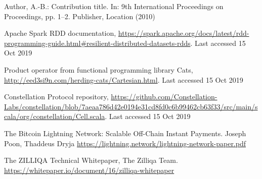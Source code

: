 \documentclass[runningheads]{llncs}
\begin{document}
\begin{thebibliography}{8}
Author, A.-B.: Contribution title. In: 9th International Proceedings
on Proceedings, pp. 1--2. Publisher, Location (2010)

Apache Spark RDD documentation, \url{https://spark.apache.org/docs/latest/rdd-programming-guide.html\#resilient-distributed-datasets-rdds}. Last accessed 15 Oct 2019

Product operator from functional programming library Cats, \url{http://eed3si9n.com/herding-cats/Cartesian.html}. Last accessed 15 Oct 2019

Constellation Protocol repository, \url{https://github.com/Constellation-Labs/constellation/blob/7aeaa786d42e0194e31cd8fd0c6b99462cb63f33/src/main/scala/org/constellation/Cell.scala}. Last accessed 15 Oct 2019

The Bitcoin Lightning Network: Scalable Off-Chain Instant Payments. Joseph Poon, Thaddeus Dryja \url{https://lightning.network/lightning-network-paper.pdf}

The ZILLIQA Technical Whitepaper, The Zilliqa Team. \url{https://whitepaper.io/document/16/zilliqa-whitepaper}


\end{thebibliography}
\end{document}
